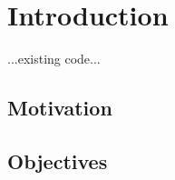 
\chapter{Introduction\label{chap:introduction}}

...existing code...

\section{Motivation}


\section{Objectives}

